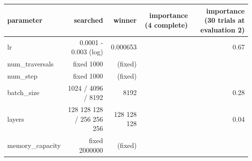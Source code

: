 \begin{tabular}{lrrrr}
\toprule
parameter & searched & winner & importance (4 complete) & importance (30 trials at evaluation 2) \\
\midrule
lr & 0.0001 - 0.003 (log) & 0.000653 &  & 0.67 \\
num\_traversals & fixed 1000 & (fixed) &  &  \\
num\_step & fixed 1000 & (fixed) &  &  \\
batch\_size & 1024 / 4096 / 8192 & 8192 &  & 0.28 \\
layers & 128 128 128 / 256 256 256 & 128 128 128 &  & 0.04 \\
memory\_capacity & fixed 2000000 & (fixed) &  &  \\
\bottomrule
\end{tabular}
